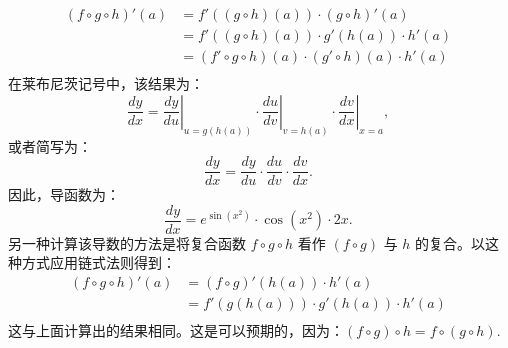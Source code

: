 $$
\begin{aligned}
(f \circ g \circ h)'(a) 
&= f'((g \circ h)(a)) \cdot (g \circ h)'(a)\\
&= f'((g \circ h)(a)) \cdot g'(h(a)) \cdot h'(a)\\
&= (f' \circ g \circ h)(a) \cdot (g' \circ h)(a) \cdot h'(a)\\
\end{aligned}~
$$
在莱布尼茨记号中，该结果为：
$$
\frac{dy}{dx} = \left.\frac{dy}{du}\right|_{u=g(h(a))} \cdot \left.\frac{du}{dv}\right|_{v=h(a)} \cdot \left.\frac{dv}{dx}\right|_{x=a},~
$$
或者简写为：
$$
\frac{dy}{dx} = \frac{dy}{du} \cdot \frac{du}{dv} \cdot \frac{dv}{dx}.~
$$
因此，导函数为：
$$
\frac{dy}{dx} = e^{\sin(x^2)} \cdot \cos(x^2) \cdot 2x.~
$$
另一种计算该导数的方法是将复合函数 $f \circ g \circ h$ 看作 $(f \circ g)$ 与 $h$ 的复合。以这种方式应用链式法则得到：
$$
\begin{aligned}
(f \circ g \circ h)'(a) &= (f \circ g)'(h(a)) \cdot h'(a)\\
&= f'(g(h(a))) \cdot g'(h(a)) \cdot h'(a)\\
\end{aligned}~
$$
这与上面计算出的结果相同。这是可以预期的，因为：$(f \circ g) \circ h = f \circ (g \circ h)$.

